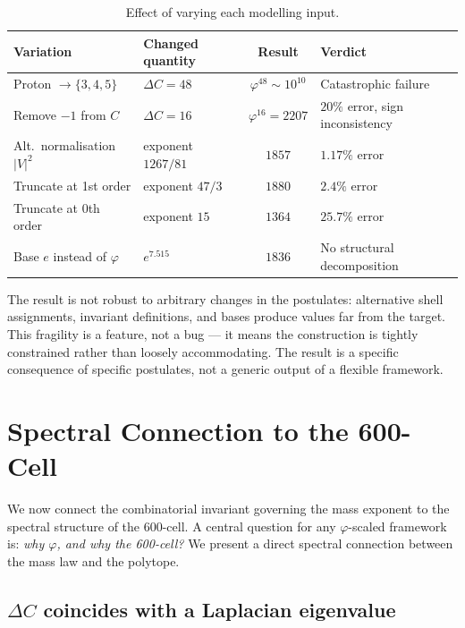 \documentclass[12pt]{article}
\newcommand{\phig}{\varphi}
\begin{document}
\begin{table}[ht]
\centering
\caption{Effect of varying each modelling input.}
\label{tab:sensitivity}
\begin{tabular}{@{}llcl@{}}
\toprule
Variation & Changed quantity & Result & Verdict \\
\midrule
Proton $\to \{3,4,5\}$ & $\Delta C = 48$ & $\phig^{48} \sim 10^{10}$ & Catastrophic failure \\
Remove $-1$ from $C$ & $\Delta C = 16$ & $\phig^{16} = 2207$ & $20\%$ error, sign inconsistency \\
Alt.\ normalisation $|V|^2$ & exponent $1267/81$ & $1857$ & $1.17\%$ error \\
Truncate at 1st order & exponent $47/3$ & $1880$ & $2.4\%$ error \\
Truncate at 0th order & exponent $15$ & $1364$ & $25.7\%$ error \\
Base $e$ instead of $\phig$ & $e^{7.515}$ & $1836$ & No structural decomposition \\
\bottomrule
\end{tabular}
\end{table}

The result is not robust to arbitrary changes in the postulates: alternative shell assignments, invariant definitions, and bases produce values far from the target. This fragility is a feature, not a bug --- it means the construction is tightly constrained rather than loosely accommodating. The result is a specific consequence of specific postulates, not a generic output of a flexible framework.

\section{Spectral Connection to the 600-Cell}\label{sec:uniqueness}

We now connect the combinatorial invariant governing the mass exponent to the spectral structure of the 600-cell. A central question for any $\phig$-scaled framework is: \textit{why $\phig$, and why the 600-cell?} We present a direct spectral connection between the mass law and the polytope.

\subsection{$\Delta C$ coincides with a Laplacian eigenvalue}
\end{document}
